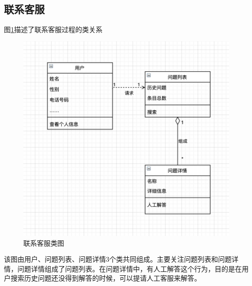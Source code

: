 \documentclass[a4paper]{ctexart}
\begin{document}
\subsection{联系客服}
图\ref{fig:联系客服类图}描述了联系客服过程的类关系
\begin{figure}[H]
\centering
\includegraphics[scale=0.3]{image/1_7类图.png}
\caption{联系客服类图}
\label{fig:联系客服类图}
\end{figure}
该图由用户、问题列表、问题详情3个类共同组成。主要关注问题列表和问题详情，问题详情组成了问题列表。在问题详情中，有人工解答这个行为，目的是在用户搜索历史问题还没得到解答的时候，可以提请人工客服来解答。\\
\end{document}
